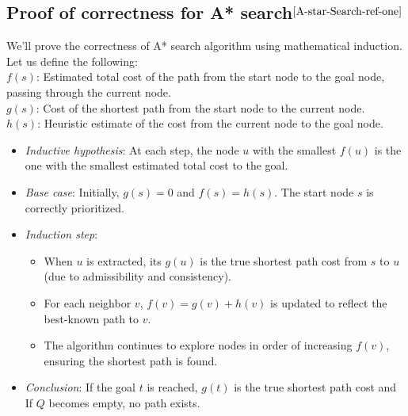 \begin{appendices}
	\section{Proof of correctness for A* search$^{\cite{A-star-Search-ref-one}}$}\label{appendix:astar:correctness}

	We'll prove the correctness of A* search algorithm using mathematical induction. Let us define the following: \\
	$f(s)$: Estimated total cost of the path from the start node to the goal node, passing through the current node. \\
	$g(s)$: Cost of the shortest path from the start node to the current node. \\
	$h(s)$: Heuristic estimate of the cost from the current node to the goal node.
	\begin{itemize}
		\item \textit{Inductive hypothesis}: At each step, the node $u$ with the smallest $f(u)$ is the one with the smallest estimated total cost to the goal.
		\item \textit{Base case}: Initially, $g(s)=0$ and $f(s)=h(s)$. The start node $s$ is correctly prioritized.
		\item \textit{Induction step}: 
			\begin{itemize}
				\item When $u$ is extracted, its $g(u)$ is the true shortest path cost from $s$ to $u$ (due to admissibility and consistency).
				\item For each neighbor $v$, $f(v)=g(v)+h(v)$ is updated to reflect the best-known path to $v$.
				\item The algorithm continues to explore nodes in order of increasing $f(v)$, ensuring the shortest path is found.
			\end{itemize}
		\item \textit{Conclusion}: If the goal $t$ is reached, $g(t)$ is the true shortest path cost and If $Q$ becomes empty, no path exists.
	\end{itemize}

\end{appendices}
